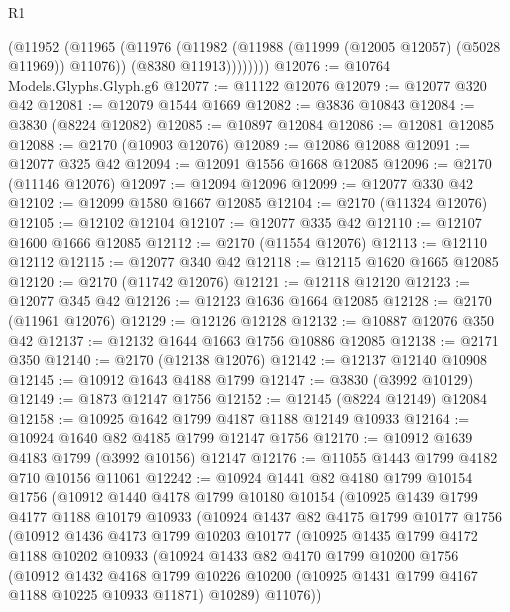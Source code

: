 \begin{lexlean}{R1}
\begin{coremodule}
            (@11952
              (@11965
                (@11976
                  (@11982 (@11988 (@11999 (@12005 @12057) (@5028 @11969)) @11076))
                  (@8380 @11913))))))))
@12076 := @10764 Models.Glyphs.Glyph.g6
@12077 := @11122 @12076
@12079 := @12077 @320 @42
@12081 := @12079 @1544 @1669
@12082 := @3836 @10843
@12084 := @3830 (@8224 @12082)
@12085 := @10897 @12084
@12086 := @12081 @12085
@12088 := @2170 (@10903 @12076)
@12089 := @12086 @12088
@12091 := @12077 @325 @42
@12094 := @12091 @1556 @1668 @12085
@12096 := @2170 (@11146 @12076)
@12097 := @12094 @12096
@12099 := @12077 @330 @42
@12102 := @12099 @1580 @1667 @12085
@12104 := @2170 (@11324 @12076)
@12105 := @12102 @12104
@12107 := @12077 @335 @42
@12110 := @12107 @1600 @1666 @12085
@12112 := @2170 (@11554 @12076)
@12113 := @12110 @12112
@12115 := @12077 @340 @42
@12118 := @12115 @1620 @1665 @12085
@12120 := @2170 (@11742 @12076)
@12121 := @12118 @12120
@12123 := @12077 @345 @42
@12126 := @12123 @1636 @1664 @12085
@12128 := @2170 (@11961 @12076)
@12129 := @12126 @12128
@12132 := @10887 @12076 @350 @42
@12137 := @12132 @1644 @1663 @1756 @10886 @12085
@12138 := @2171 @350
@12140 := @2170 (@12138 @12076)
@12142 := @12137 @12140 @10908
@12145 := @10912 @1643 @4188 @1799
@12147 := @3830 (@3992 @10129)
@12149 := @1873 @12147 @1756
@12152 := @12145 (@8224 @12149) @12084
@12158 := @10925 @1642 @1799 @4187 @1188 @12149 @10933
@12164 := @10924 @1640 @82 @4185 @1799 @12147 @1756
@12170 := @10912 @1639 @4183 @1799 (@3992 @10156) @12147
@12176 := @11055 @1443 @1799 @4182 @710 @10156 @11061
@12242 := @10924
    @1441
    @82
    @4180
    @1799
    @10154
    @1756
    (@10912
      @1440
      @4178
      @1799
      @10180
      @10154
      (@10925
        @1439
        @1799
        @4177
        @1188
        @10179
        @10933
        (@10924
          @1437
          @82
          @4175
          @1799
          @10177
          @1756
          (@10912
            @1436
            @4173
            @1799
            @10203
            @10177
            (@10925
              @1435
              @1799
              @4172
              @1188
              @10202
              @10933
              (@10924
                @1433
                @82
                @4170
                @1799
                @10200
                @1756
                (@10912
                  @1432
                  @4168
                  @1799
                  @10226
                  @10200
                  (@10925 @1431 @1799 @4167 @1188 @10225 @10933 @11871)
                  @10289)
                @11076))

\end{coremodule}
\end{lexlean}
